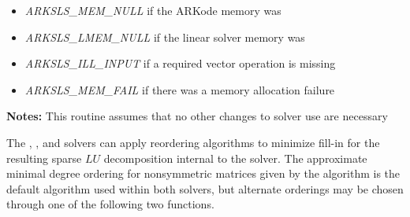 \documentclass[letterpaper,10pt,english]{sphinxmanual}
\begin{document}
\begin{fulllineitems}
\begin{description}
\begin{itemize}
\item {} 
\emph{ARKSLS\_MEM\_NULL}  if the ARKode memory was 

\item {} 
\emph{ARKSLS\_LMEM\_NULL}  if the linear solver memory was 

\item {} 
\emph{ARKSLS\_ILL\_INPUT} if a required vector operation is missing

\item {} 
\emph{ARKSLS\_MEM\_FAIL} if there was a memory allocation failure

\end{itemize}

\end{description}

\textbf{Notes:}  This routine assumes that no other changes to solver
use are necessary

\end{fulllineitems}


The {\hyperref[c_interface/User_callable:c.ARKKLU]{\emph{}}}, {\hyperref[c_interface/User_callable:c.ARKMassKLU]{\emph{}}}, 
and {\hyperref[c_interface/User_callable:c.ARKMassSuperLUMT]{\emph{}}} solvers can apply reordering
algorithms to minimize fill-in for the resulting sparse \(LU\)
decomposition internal to the solver.  The approximate minimal degree
ordering for nonsymmetric matrices given by the  algorithm
is the default algorithm used within both solvers, but alternate
orderings may be chosen through one of the following two functions.
\end{document}
